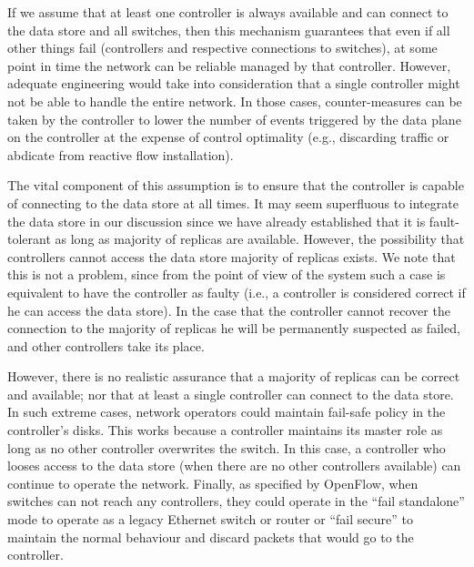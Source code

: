 If we assume that at least one controller is always available and can connect to the data store and all switches, then this mechanism guarantees that even if all other things fail (controllers and respective connections to switches), at some point in time the network can be reliable managed by that controller. 
However, adequate engineering would  take into consideration that a single controller might not be able to handle the entire network. In those cases, counter-measures can be taken by the controller to lower the number of events triggered by the data plane on the controller at the expense of control optimality (e.g., discarding traffic or abdicate from reactive flow installation). 

The vital component of this assumption is to ensure that the controller is capable of connecting to the data store at all times. 
It may seem superfluous to integrate the data store in our discussion since we have already established that it is fault-tolerant as long as majority of replicas are available. 
However, the possibility that controllers cannot access the data store majority of replicas exists. 
We note that this is not a problem, since from the point of view of the system such a case is equivalent to have the controller as faulty (i.e., a controller is considered correct if he can access the data store). 
In the case that the controller cannot recover the  connection to the majority of replicas he will be permanently suspected as failed, and other controllers take its place. 

However, there is no realistic assurance that a majority of replicas can be correct and available; nor that at least a single controller can connect to the data store. 
In such extreme cases, network operators could maintain fail-safe policy  in the controller's disks. 
This works because a controller maintains its master role as long as no other controller overwrites the switch. 
In this case, a controller who looses access to the data store (when there are no other controllers available) can continue to operate the network. 
Finally, as specified by OpenFlow,  when switches can not reach any controllers, they  could operate in the ``fail standalone'' mode to operate as a legacy Ethernet switch or router or ``fail secure'' to maintain the normal behaviour and discard packets that would go to the controller. 



